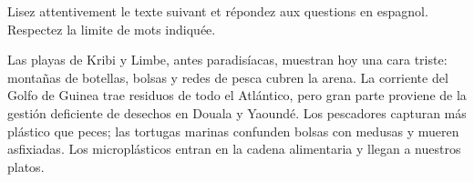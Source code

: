 \documentclass[11pt]{article}
\begin{document}
\begin{exercice}
Lisez attentivement le texte suivant et répondez aux questions en espagnol. Respectez la limite de mots indiquée.
\begin{textebox}
Las playas de Kribi y Limbe, antes paradisíacas, muestran hoy una cara triste: montañas de botellas, bolsas y redes de pesca cubren la arena. La corriente del Golfo de Guinea trae residuos de todo el Atlántico, pero gran parte proviene de la gestión deficiente de desechos en Douala y Yaoundé. Los pescadores capturan más plástico que peces; las tortugas marinas confunden bolsas con medusas y mueren asfixiadas. Los microplásticos entran en la cadena alimentaria y llegan a nuestros platos.


\end{textebox}
\end{exercice}
\end{document}
